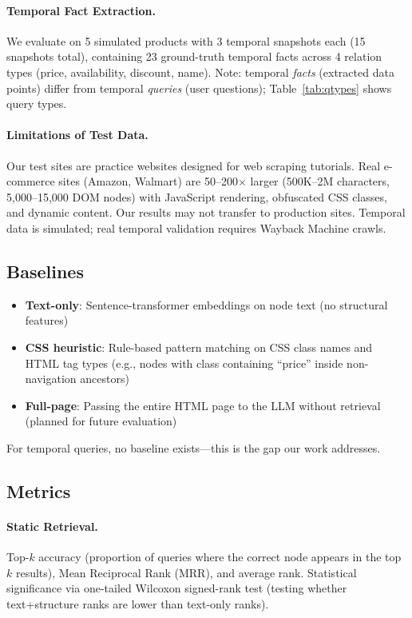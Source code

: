 \documentclass[11pt]{article}
\begin{document}
\paragraph{Temporal Fact Extraction.} We evaluate on 5 simulated products with 3 temporal snapshots each (15 snapshots total), containing 23 ground-truth temporal facts across 4 relation types (price, availability, discount, name). Note: temporal \emph{facts} (extracted data points) differ from temporal \emph{queries} (user questions); Table~\ref{tab:qtypes} shows query types.

\paragraph{Limitations of Test Data.} Our test sites are practice websites designed for web scraping tutorials. Real e-commerce sites (Amazon, Walmart) are 50--200$\times$ larger (500K--2M characters, 5,000--15,000 DOM nodes) with JavaScript rendering, obfuscated CSS classes, and dynamic content. Our results may not transfer to production sites. Temporal data is simulated; real temporal validation requires Wayback Machine crawls.

\subsection{Baselines}

\begin{itemize}
    \item \textbf{Text-only}: Sentence-transformer embeddings on node text (no structural features)
    \item \textbf{CSS heuristic}: Rule-based pattern matching on CSS class names and HTML tag types (e.g., nodes with class containing ``price'' inside non-navigation ancestors)
    \item \textbf{Full-page}: Passing the entire HTML page to the LLM without retrieval (planned for future evaluation)
\end{itemize}

For temporal queries, no baseline exists---this is the gap our work addresses.

\subsection{Metrics}

\paragraph{Static Retrieval.} Top-$k$ accuracy (proportion of queries where the correct node appears in the top $k$ results), Mean Reciprocal Rank (MRR), and average rank. Statistical significance via one-tailed Wilcoxon signed-rank test (testing whether text+structure ranks are lower than text-only ranks).
\end{document}

